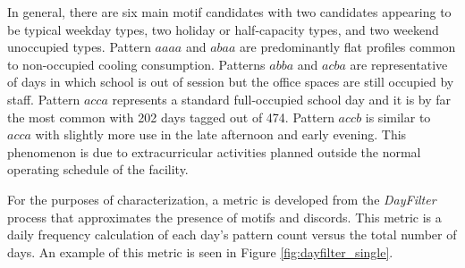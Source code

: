 In general, there are six main motif candidates with two candidates appearing to be typical weekday types, two holiday or half-capacity types, and two weekend unoccupied types. Pattern $aaaa$ and $abaa$ are predominantly flat profiles common to non-occupied cooling consumption. Patterns $abba$ and $acba$ are representative of days in which school is out of session but the office spaces are still occupied by staff. Pattern $acca$ represents a standard full-occupied school day and it is by far the most common with 202 days tagged out of 474. Pattern $accb$ is similar to $acca$ with slightly more use in the late afternoon and early evening. This phenomenon is due to extracurricular activities planned outside the normal operating schedule of the facility.

For the purposes of characterization, a metric is developed from the \emph{DayFilter} process that approximates the presence of motifs and discords. This metric is a daily frequency calculation of each day's pattern count versus the total number of days. An example of this metric is seen in Figure \ref{fig:dayfilter_single}.